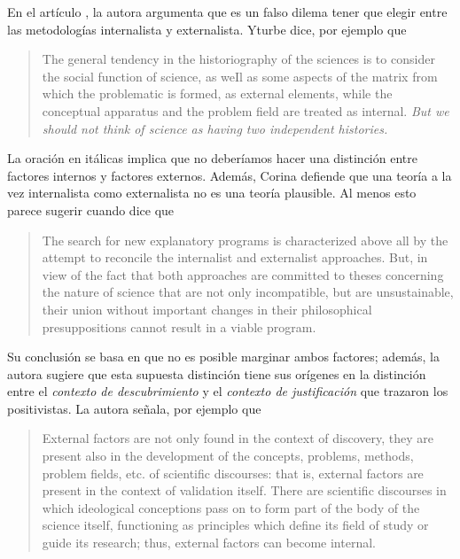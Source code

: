 En el artículo , la autora argumenta que es un falso dilema tener que elegir entre las metodologías internalista y externalista.
Yturbe dice, por ejemplo que

\begin{quote}
	The general tendency in the historiography of the sciences is to consider the social function of science, as weIl as some aspects of the matrix from which the problematic is formed, as external elements, while the conceptual apparatus and the problem field are treated as internal. \emph{But we should not think of science as having two independent histories.} \parencite[][p. 85. Énfasis agregado]{Yturbe1995}
\end{quote}

La oración en itálicas implica que no deberíamos hacer una distinción entre factores internos y factores externos.
Además, Corina defiende que una teoría a la vez internalista como externalista no es una teoría plausible.
Al menos esto parece sugerir cuando dice que

\begin{quote}
	The search for new explanatory programs is characterized above all by the attempt to reconcile the internalist and externalist approaches.
	But, in view of the fact that both approaches are committed to theses concerning the nature of science that are not only incompatible, but are unsustainable, their union without important changes in their philosophical presuppositions cannot result in a viable program. \parencite[][p. 79]{Yturbe1995}
\end{quote}

Su conclusión se basa en que no es posible marginar ambos factores; además, la autora sugiere que esta supuesta distinción tiene sus orígenes en la distinción entre el \emph{contexto de descubrimiento} y el \emph{contexto de justificación} que trazaron los positivistas.
La autora señala, por ejemplo que

\begin{quote}
	External factors are not only found in the context of discovery, they are present also in the development of the concepts, problems, methods, problem fields, etc. of scientific discourses: that is, external factors are present in the context of validation itself.
	There are scientific discourses in which ideological conceptions pass on to form part of the body of the science itself, functioning as principles which define its field of study or guide its research; thus, external factors can become internal. \parencite[][p. 85]{Yturbe1995}
\end{quote}

